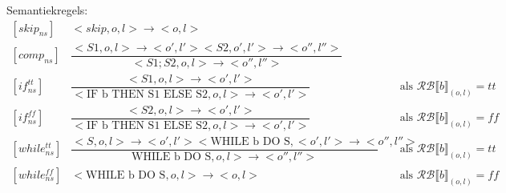 \documentclass[12pt]{article}
\newcommand{\RB}{\mathcal{RB}}
\begin{document}
Semantiekregels:\\
\renewcommand*{\arraystretch}{2.5}
\[
\begin{matrix}
[skip_{ns}]  & <skip, o, l> \rightarrow <o, l>\\
[comp_{ns}]  & \dfrac{<S1, o, l> \rightarrow <o', l'> <S2, o', l'> \rightarrow <o'', l''>}{<S1;S2, o, l> \rightarrow <o'', l''>}\\
[if_{ns}^{tt}] & \dfrac{<S1, o, l> \rightarrow <o', l'>}{<\mbox{IF b THEN S1 ELSE S2}, o, l> \rightarrow <o', l'>} &&\mbox{ als }\RB \llbracket b \rrbracket_{(o,l)} = tt\\
[if_{ns}^{ff}] & \dfrac{<S2, o, l> \rightarrow <o', l'>}{<\mbox{IF b THEN S1 ELSE S2}, o, l> \rightarrow <o', l'>} &&\mbox{ als }\RB \llbracket b \rrbracket_{(o,l)} = ff\\
[while_{ns}^{tt}] & \dfrac{<S, o, l> \rightarrow <o', l'> <\mbox{WHILE b DO S}, <o', l'> \rightarrow <o'',l''>}{\mbox{WHILE b DO S}, o, l> \rightarrow <o'',l''>} &&\mbox{ als }\RB \llbracket b \rrbracket_{(o,l)} = tt\\
[while_{ns}^{ff}] & <\mbox{WHILE b DO S}, o, l> \rightarrow <o,l> &&\mbox{ als }\RB \llbracket b \rrbracket_{(o,l)} = ff\\
\end{matrix}
\]
\end{document}
